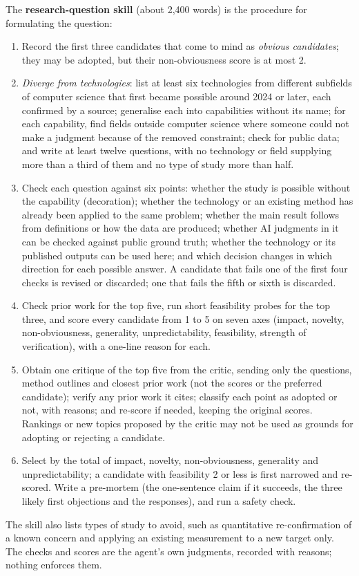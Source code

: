 \documentclass[11pt]{article}
\begin{document}
The \textbf{research-question skill} (about 2,400 words) is the procedure for formulating the question:
\begin{enumerate}[leftmargin=*,itemsep=1pt]
  \item Record the first three candidates that come to mind as \emph{obvious candidates}; they may be adopted, but their non-obviousness score is at most 2.
  \item \emph{Diverge from technologies}: list at least six technologies from different subfields of computer science that first became possible around 2024 or later, each confirmed by a source; generalise each into capabilities without its name; for each capability, find fields outside computer science where someone could not make a judgment because of the removed constraint; check for public data; and write at least twelve questions, with no technology or field supplying more than a third of them and no type of study more than half.
  \item Check each question against six points: whether the study is possible without the capability (decoration); whether the technology or an existing method has already been applied to the same problem; whether the main result follows from definitions or how the data are produced; whether AI judgments in it can be checked against public ground truth; whether the technology or its published outputs can be used here; and which decision changes in which direction for each possible answer. A candidate that fails one of the first four checks is revised or discarded; one that fails the fifth or sixth is discarded.
  \item Check prior work for the top five, run short feasibility probes for the top three, and score every candidate from 1 to 5 on seven axes (impact, novelty, non-obviousness, generality, unpredictability, feasibility, strength of verification), with a one-line reason for each.
  \item Obtain one critique of the top five from the critic, sending only the questions, method outlines and closest prior work (not the scores or the preferred candidate); verify any prior work it cites; classify each point as adopted or not, with reasons; and re-score if needed, keeping the original scores. Rankings or new topics proposed by the critic may not be used as grounds for adopting or rejecting a candidate.
  \item Select by the total of impact, novelty, non-obviousness, generality and unpredictability; a candidate with feasibility 2 or less is first narrowed and re-scored. Write a pre-mortem (the one-sentence claim if it succeeds, the three likely first objections and the responses), and run a safety check.
\end{enumerate}
The skill also lists types of study to avoid, such as quantitative re-confirmation of a known concern and applying an existing measurement to a new target only. The checks and scores are the agent's own judgments, recorded with reasons; nothing enforces them.
\end{document}

